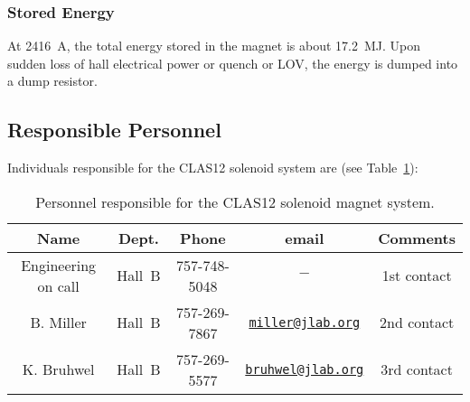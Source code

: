 \subsubsection{Stored Energy}

At 2416~A, the total energy stored in the magnet is about 17.2~MJ. Upon sudden loss of hall 
electrical power or quench or LOV, the energy is dumped into a dump resistor.

\subsection{Responsible Personnel}

Individuals responsible for the CLAS12 solenoid system are (see Table~\ref{tb:solenoid}):

\begin{table}[!htb]
\centering
\begin{tabular}{|c|c|c|c|c|} \hline
Name&Dept.&Phone&email&Comments \\ \hline
Engineering on call& Hall~B & 757-748-5048 &$-$& 1st contact \\ \hline
B. Miller          & Hall~B & 757-269-7867 &\href{mailto:miller@jlab.org}{\nolinkurl{miller@jlab.org}}&2nd contact \\ \hline
K. Bruhwel         & Hall~B & 757-269-5577 &\href{mailto:}{\nolinkurl{bruhwel@jlab.org}}&3rd contact \\ \hline
\end{tabular}
\caption{Personnel responsible for the CLAS12 solenoid magnet system.} 
\label{tb:solenoid}
\end{table}

